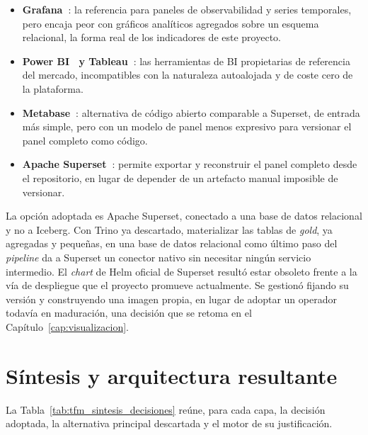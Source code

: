 \begin{itemize}
  \item \textbf{Grafana~\cite{grafana_docs}}: la referencia para paneles
  de observabilidad y series temporales, pero encaja peor con gráficos
  analíticos agregados sobre un esquema relacional, la forma real de los
  indicadores de este proyecto.
  \item \textbf{Power BI~\cite{microsoft_power_bi_docs} y
  Tableau~\cite{tableau_docs}}: las herramientas de BI propietarias de
  referencia del mercado, incompatibles con la naturaleza autoalojada y
  de coste cero de la plataforma.
  \item \textbf{Metabase~\cite{metabase_docs}}: alternativa de código
  abierto comparable a Superset, de entrada más simple, pero con un
  modelo de panel menos expresivo para versionar el panel completo como
  código.
  \item \textbf{Apache Superset~\cite{apache_superset_docs}}: permite
  exportar y reconstruir el panel completo desde el repositorio, en lugar
  de depender de un artefacto manual imposible de versionar.
\end{itemize}

La opción adoptada es Apache Superset, conectado a una base de datos
relacional y no a Iceberg. Con Trino ya descartado, materializar las
tablas de \textit{gold}, ya agregadas y pequeñas, en una base de datos
relacional como último paso del \textit{pipeline} da a Superset un
conector nativo sin necesitar ningún servicio intermedio. El
\textit{chart} de Helm oficial de Superset resultó estar obsoleto frente
a la vía de despliegue que el proyecto promueve actualmente. Se gestionó
fijando su versión y construyendo una imagen propia, en lugar de adoptar
un operador todavía en maduración, una decisión que se retoma en el
Capítulo~\ref{cap:visualizacion}.

\Needspace{9cm}
\section{Síntesis y arquitectura resultante}
\label{sec:estado_arte_sintesis}

La Tabla~\ref{tab:tfm_sintesis_decisiones} reúne, para cada capa, la
decisión adoptada, la alternativa principal descartada y el motor de su
justificación.

